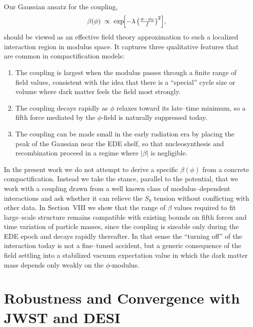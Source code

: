 \documentclass[a4paper,11pt]{article}
\begin{document}
Our Gaussian ansatz for the coupling,
\begin{equation}
\beta(\phi) \;\propto\; \exp\!\Bigl[-\lambda\,\bigl(\tfrac{\phi-\phi_0}{f}\bigr)^2\Bigr],
\end{equation}
should be viewed as an effective field theory approximation to such a localized interaction region in modulus space. It captures three qualitative features that are common in compactification models:
\begin{enumerate}
    \item The coupling is largest when the modulus passes through a finite range of field values, consistent with the idea that there is a ``special'' cycle size or volume where dark matter feels the field most strongly.
    \item The coupling decays rapidly as $\phi$ relaxes toward its late--time minimum, so a fifth force mediated by the $\phi$-field is naturally suppressed today.
    \item The coupling can be made small in the early radiation era by placing the peak of the Gaussian near the EDE shelf, so that nucleosynthesis and recombination proceed in a regime where $|\beta|$ is negligible.
\end{enumerate}

In the present work we do not attempt to derive a specific $\beta(\phi)$ from a concrete compactification. Instead we take the stance, parallel to the potential, that we work with a coupling drawn from a well known class of modulus--dependent interactions and ask whether it can relieve the $S_8$ tension without conflicting with other data. In Section~VIII we show that the range of $\beta$ values required to fit large--scale structure remains compatible with existing bounds on fifth forces and time variation of particle masses, since the coupling is sizeable only during the EDE epoch and decays rapidly thereafter. In that sense the ``turning off'' of the interaction today is not a fine--tuned accident, but a generic consequence of the field settling into a stabilized vacuum expectation value in which the dark matter mass depends only weakly on the $\phi$-modulus.


\section{Robustness and Convergence with JWST and DESI}
\end{document}
